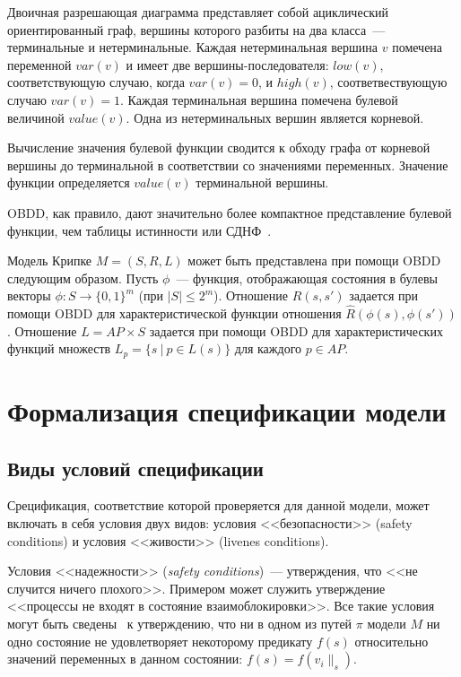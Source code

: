 \documentclass[a4paper,notitlepage,14pt]{article}
\begin{document}
Двоичная разрешающая диаграмма представляет собой ациклический ориентированный граф,
вершины которого разбиты на два класса~--- терминальные и нетерминальные. Каждая
нетерминальная вершина $v$ помечена переменной $var(v)$ и имеет две вершины-последователя:
$low(v)$, соответствующую случаю, когда $var(v) = 0$, и $high(v)$, соответвествующую
случаю $var(v) = 1$. Каждая терминальная вершина помечена булевой величиной
$value(v)$. Одна из нетерминальных вершин является корневой.

Вычисление значения булевой функции сводится к обходу графа от корневой вершины до
терминальной в соответствии со значениями переменных. Значение функции определяется
$value(v)$ терминальной вершины. 

OBDD, как правило, дают значительно более компактное представление булевой функции, чем
таблицы истинности или СДНФ~\cite{Clarke}.

Модель Крипке $M = (S, R, L)$ может быть представлена при помощи OBDD следующим
образом. Пусть $\phi$~--- функция, отображающая состояния в булевы векторы $\phi: S
\rightarrow \{0, 1\}^m$ (при $|S| \leq 2^m$). Отношение $R(s, s')$ задается при помощи
OBDD для характеристической функции отношения $\widehat{R}(\phi(s), \phi(s'))$. Отношение
$L = AP \times S$ задается при помощи OBDD для характеристических функций множеств $L_p =
\{s~|~p \in L(s) \}$ для каждого $p \in AP$.

\section{Формализация спецификации модели}
\label{sec:specification}

\subsection{Виды условий спецификации}
\label{sec:cond-types}

Срецификация, соответствие которой проверяется для данной модели, может включать в себя
условия двух видов: условия <<безопасности>> (safety conditions) и условия <<живости>>
(livenes conditions).

Условия <<надежности>> (\emph{safety conditions})~--- утверждения, что <<не случится
ничего плохого>>. Примером может служить утверждение <<процессы не входят в состояние
взаимоблокировки>>. Все такие условия могут быть сведены~\cite{Clarke} к утверждению, что
ни в одном из путей $\pi$ модели $M$ ни одно состояние не удовлетворяет некоторому
предикату $f(s)$ относительно значений переменных в данном состоянии: $f(s) = f(v_i\|_s)$.
\end{document}

